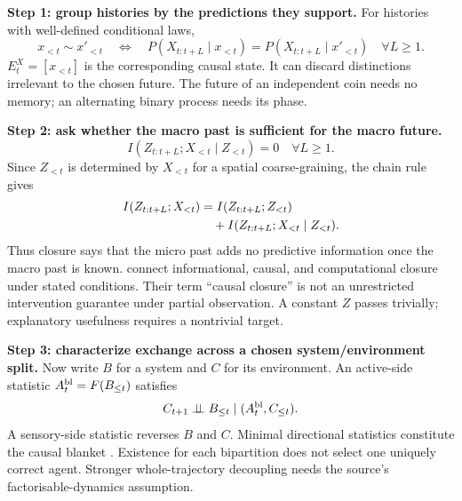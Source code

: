 \documentclass[11pt,letterpaper]{article}
\begin{document}
\textbf{Step 1: group histories by the predictions they support.} For histories with well-defined conditional laws,
\begin{equation}
 x_{<t}\sim x'_{<t}\quad\Longleftrightarrow\quad
 P(X_{t:t+L}\mid x_{<t})=P(X_{t:t+L}\mid x'_{<t})\quad\forall L\geq1.
\end{equation}
$E_t^X=[x_{<t}]$ is the corresponding causal state. It can discard distinctions irrelevant to the chosen future. The future of an independent coin needs no memory; an alternating binary process needs its phase.

\textbf{Step 2: ask whether the macro past is sufficient for the macro future.}
\begin{equation}
 I(Z_{t:t+L};X_{<t}\mid Z_{<t})=0\quad\forall L\geq1.
\end{equation}
Since $Z_{<t}$ is determined by $X_{<t}$ for a spatial coarse-graining, the chain rule gives
\begin{align}
 I(Z_{t:t+L};X_{<t})&=I(Z_{t:t+L};Z_{<t})\\
 &\quad+I(Z_{t:t+L};X_{<t}\mid Z_{<t}).\notag
\end{align}
Thus closure says that the micro past adds no predictive information once the macro past is known. \citet[PDF pp. 5--8]{rosas2024software} connect informational, causal, and computational closure under stated conditions. Their term ``causal closure'' is not an unrestricted intervention guarantee under partial observation. A constant $Z$ passes trivially; explanatory usefulness requires a nontrivial target.

\textbf{Step 3: characterize exchange across a chosen system/environment split.} Now write $B$ for a system and $C$ for its environment. An active-side statistic $A_t^{\rm bl}=F(B_{\leq t})$ satisfies
\begin{equation}
 C_{t+1}\mathrel{\perp\!\!\!\perp} B_{\leq t}\mid(A_t^{\rm bl},C_{\leq t}).
\end{equation}
A sensory-side statistic reverses $B$ and $C$. Minimal directional statistics constitute the causal blanket \citep[PDF pp. 4--7]{rosas2020blankets}. Existence for each bipartition does not select one uniquely correct agent. Stronger whole-trajectory decoupling needs the source's factorisable-dynamics assumption.

\end{document}
